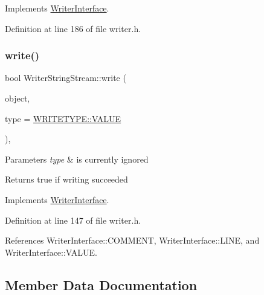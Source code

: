 Implements \hyperlink{classWriterInterface_a8865a526bb8c67ff4c96f25fc8217c81}{Writer\+Interface}.



Definition at line 186 of file writer.\+h.

\mbox{\label{classWriterStringStream_abe031fad8bac6f5379b97a7f9e9ed281}} 
\subsubsection{\texorpdfstring{write()}{write()}}
{\footnotesize\ttfamily bool Writer\+String\+Stream\+::write (\begin{DoxyParamCaption}\item[{const std\+::string \&}]{object,  }\item[{const \hyperlink{classWriterInterface_af35706b761b016972144a9333637d93d}{W\+R\+I\+T\+E\+T\+Y\+PE} \&}]{type = {\ttfamily \hyperlink{classWriterInterface_af35706b761b016972144a9333637d93daecc2e9c313faddb07e7da223c1dc5c3f}{W\+R\+I\+T\+E\+T\+Y\+P\+E\+::\+V\+A\+L\+UE}} }\end{DoxyParamCaption})\hspace{0.3cm}{\ttfamily [inline]}, {\ttfamily [virtual]}}


\begin{DoxyParams}{Parameters}
{\em type} & is currently ignored \\
\hline
\end{DoxyParams}
\begin{DoxyReturn}{Returns}
true if writing succeeded 
\end{DoxyReturn}


Implements \hyperlink{classWriterInterface_a2f756ac0b3299f4dbadececad4055424}{Writer\+Interface}.



Definition at line 147 of file writer.\+h.



References Writer\+Interface\+::\+C\+O\+M\+M\+E\+NT, Writer\+Interface\+::\+L\+I\+NE, and Writer\+Interface\+::\+V\+A\+L\+UE.



\subsection{Member Data Documentation}
\mbox{\label{classWriterStringStream_aa633a917974ab987e4cddd44e408dc53}} 
